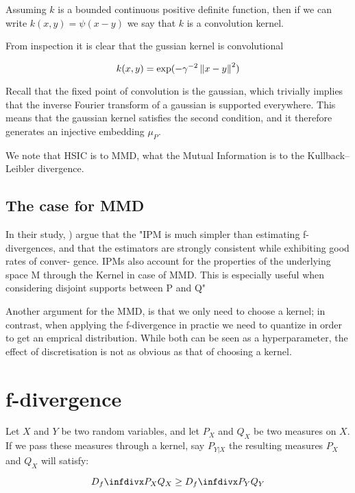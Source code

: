 Assuming $k$ is a bounded continuous positive definite function, then if we can write
$k(x, y) = \psi (x - y)$ we say that $k$ is a convolution kernel.

From inspection it is clear that the gussian kernel is convolutional

$$
    k(x, y) = \exp (-\gamma^{-2}\left\lVert x - y\right\rVert^2)
$$

Recall that the fixed point of convolution is the gaussian, which trivially implies
that the inverse Fourier transform of a gaussian is supported everywhere. 
 This means that the gaussian kernel satisfies the second
condition, and it therefore generates an injective embedding $\mu_P$.

We note that HSIC is to MMD, what the Mutual Information is to the Kullback–Leibler divergence.

\subsection{The case for MMD}

In their study, \cite{sriperumbudur2009integral}) argue that the "IPM is much
simpler than estimating f-divergences, and that the estimators
are strongly consistent while exhibiting good rates of conver-
gence. IPMs also account for the properties of
the underlying space M through the Kernel in case of MMD. This is especially
useful when considering disjoint supports between P and Q"

Another argument for the MMD, is that we only need to choose a kernel; in contrast, 
when applying the f-divergence in practie we need to quantize in order to get an 
emprical distribution. While both can be seen as a hyperparameter, the effect of 
discretisation is not as obvious as that of choosing a kernel. 

\section{f-divergence}


\begin{lemma}
    Let $X$ and $Y$ be two random variables, and let $P_X$ and $Q_X$ be two measures on $X$. If we 
    pass these measures through a kernel, say $P_{Y|X}$ the resulting measures $P_X$ and $Q_X$ will
    satisfy:

    $$
        \infdiv{P_X}{Q_X} \geq \infdiv{P_Y}{Q_Y}
    $$
    \label{lemma:dpi}
\end{lemma}

